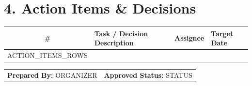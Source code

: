 \documentclass[11pt,a4paper]{article}
\begin{document}
\vspace{0.3cm}

\section*{4. Action Items \& Decisions}
\begin{table}[h!]
\centering
\begin{tabularx}{\linewidth}{|c|X|l|l|}
\hline
\rowcolor{tableheader} \textbf{\#} & \textbf{Task / Decision Description} & \textbf{Assignee} & \textbf{Target Date} \\ \hline
{{ACTION_ITEMS_ROWS}}
\end{tabularx}
\end{table}

\vspace{0.8cm}

\begin{table}[h!]
\centering
\begin{tabularx}{\linewidth}{X X}
\textbf{Prepared By:} {{ORGANIZER}} & \textbf{Approved Status:} {{STATUS}} \\
\end{tabularx}
\end{table}
\end{document}
